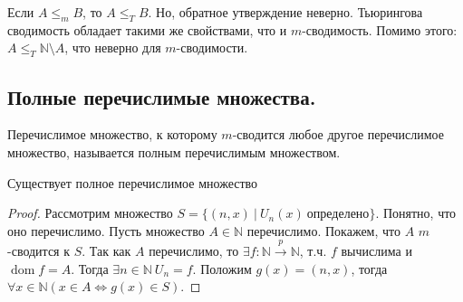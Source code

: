 Если $A \leqslant_m B$, то $A \leqslant_T B$. Но, обратное утверждение неверно. \newline
Тьюрингова сводимость обладает такими же свойствами, что и $m$-сводимость. \newline
Помимо этого: $A \leqslant_T \mathbb{N} \setminus A$, что неверно для $m$-сводимости.

\subsection{Полные перечислимые множества.}

\begin{definition}
  Перечислимое множество, к которому $m$-сводится любое другое перечислимое множество, называется полным перечислимым множеством.
\end{definition}

\begin{statement}
  Существует полное перечислимое множество
  \begin{proof}
    Рассмотрим множество $S = \{(n,x) \> | \> U_n(x) \> \textit{определено} \}$. Понятно, что оно перечислимо. Пусть множество $A \in \mathbb{N}$ перечислимо. Покажем, что $A$ $m$-сводится к $S$. \newline
    Так как $A$ перечислимо, то $\exists f : \mathbb{N} \overset{p}{\to} \mathbb{N}$, т.ч. $f$ вычислима и $\operatorname{dom} f = A$. Тогда $\exists n \in \mathbb{N} \> U_n = f$. Положим $g(x) = (n, x)$, тогда $\forall x \in \mathbb{N} (x \in A \Leftrightarrow g(x) \in S)$.
  \end{proof}
\end{statement}
